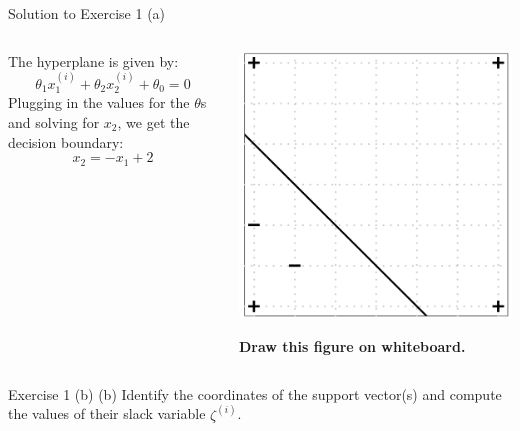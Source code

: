\documentclass[aspectratio=169]{beamer}
\newcommand{\zetai}{\zeta^{(i)}}
\begin{document}
\begin{frame}{Solution to Exercise 1 (a)}

\begin{columns}[T]
	\begin{column}[t]{0.49\textwidth}
		The hyperplane is given by:
		$$ \theta_1 x_1^{(i)} + \theta_2 x_2^{(i)} + \theta_0 = 0$$
		Plugging in the values for the $\theta$s and solving for $x_2$, we get the decision boundary:
		$$x_2 = - x_1 + 2$$
	\end{column}

	\hfill
	\begin{column}{0.49\textwidth}
		\centering
		\includegraphics[width=0.6\columnwidth]{figures/ex_1_a_1.png}
		
		\textbf{Draw this figure on whiteboard.}
	\end{column}
\end{columns}
	
\end{frame}

\begin{frame}{Exercise 1 (b)}
	(b) Identify the coordinates of the support vector(s) and compute the values of their slack variable $\zetai$.
\end{frame}
\end{document}
